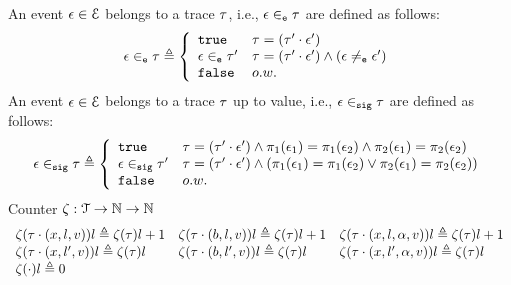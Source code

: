 %
An event $\mathtt{\epsilon} \in \mathcal{E}$ belongs to a trace $\mathtt{\tau}$, i.e., $\mathtt{\epsilon} \in_{\mathtt{e}} \mathtt{\tau}$ are defined as follows:
%
\begin{equation}
  \event \eventin \trace  
  \triangleq \left\{
  \begin{array}{ll} 
    \etrue                  & \trace =  (\trace' \cdot \event') 
                              \\
    \event \eventin \trace' & \trace =  (\trace' \cdot \event') \land (\event \eventneq \event') \\ 
    \efalse                 & o.w.
  \end{array}
  \right.
\end{equation}
%
An event $\mathtt{\epsilon} \in \mathcal{E}$ belongs to a trace $\mathtt{\tau}$ up to value, 
i.e., $\mathtt{\epsilon} \in_{\mathtt{sig}} \mathtt{\tau}$ are defined as follows:
\begin{equation}
  \event \sigin \trace  
  \triangleq \left\{
  \begin{array}{ll} 
    \etrue                  & \trace =  (\trace' \cdot \event')                          \land \pi_1(\event_1) = \pi_1(\event_2) 
                              \land  \pi_2(\event_1) = \pi_2(\event_2)  
                              \\
    \event \sigin \trace'   & \trace =  (\trace' \cdot \event') 
                              \land 
                              (\pi_1(\event_1) = \pi_1(\event_2) 
                              \lor  \pi_2(\event_1) = \pi_2(\event_2)) 
                              \\ 
    \efalse                 & o.w.
  \end{array}
  \right.
\end{equation}
%
Counter $\mathtt{\zeta} : \mathcal{T} \to \mathbb{N} \to \mathbb{N}$
\[
\begin{array}{lll}
\mathtt{\zeta}(\mathtt{\tau} \cdot (x, l, v) ) l \triangleq \mathtt{\zeta}(\mathtt{\tau}) l + 1
&
\mathtt{\zeta}(\mathtt{\tau} \cdot (b, l, v)) l \triangleq \mathtt{\zeta}(\mathtt{\tau}) l + 1
&
\mathtt{\zeta}(\mathtt{\tau} \cdot (x, l, \alpha, v)) l \triangleq \mathtt{\zeta}(\mathtt{\tau}) l + 1
\\
\mathtt{\zeta}(\mathtt{\tau}  \cdot (x, l', v)) l \triangleq \mathtt{\zeta}(\mathtt{\tau} ) l
&
\mathtt{\zeta}(\mathtt{\tau} \cdot (b, l', v)) l \triangleq \mathtt{\zeta}(\mathtt{\tau} ) l
&
\mathtt{\zeta}(\mathtt{\tau} \cdot (x, l', \alpha, v)) l \triangleq \mathtt{\zeta}(\mathtt{\tau} ) l
\\
\mathtt{\zeta}(\cdot) l \triangleq 0
&&
\end{array}
\]
